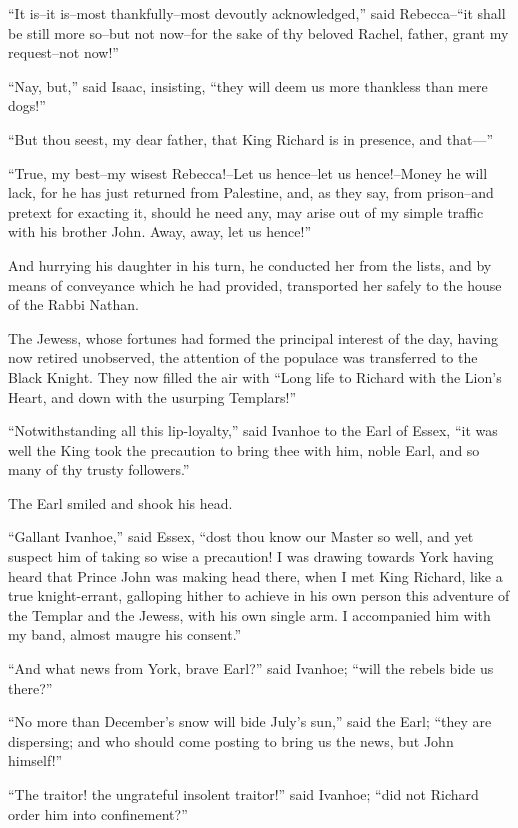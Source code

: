 ``It is--it is--most thankfully--most devoutly acknowledged,'' said
Rebecca--``it shall be still more so--but not now--for the sake of thy
beloved Rachel, father, grant my request--not now!''

``Nay, but,'' said Isaac, insisting, ``they will deem us more thankless
than mere dogs!''

``But thou seest, my dear father, that King Richard is in presence, and
that---''

``True, my best--my wisest Rebecca!--Let us hence--let us hence!--Money
he will lack, for he has just returned from Palestine, and, as they say,
from prison--and pretext for exacting it, should he need any, may arise
out of my simple traffic with his brother John. Away, away, let us
hence!''

And hurrying his daughter in his turn, he conducted her from the lists,
and by means of conveyance which he had provided, transported her safely
to the house of the Rabbi Nathan.

The Jewess, whose fortunes had formed the principal interest of the day,
having now retired unobserved, the attention of the populace was
transferred to the Black Knight. They now filled the air with ``Long
life to Richard with the Lion's Heart, and down with the usurping
Templars!''

``Notwithstanding all this lip-loyalty,'' said Ivanhoe to the Earl of
Essex, ``it was well the King took the precaution to bring thee with
him, noble Earl, and so many of thy trusty followers.''

The Earl smiled and shook his head.

``Gallant Ivanhoe,'' said Essex, ``dost thou know our Master so well,
and yet suspect him of taking so wise a precaution! I was drawing
towards York having heard that Prince John was making head there, when I
met King Richard, like a true knight-errant, galloping hither to achieve
in his own person this adventure of the Templar and the Jewess, with his
own single arm. I accompanied him with my band, almost maugre his
consent.''

``And what news from York, brave Earl?'' said Ivanhoe; ``will the rebels
bide us there?''

``No more than December's snow will bide July's sun,'' said the Earl;
``they are dispersing; and who should come posting to bring us the news,
but John himself!''

``The traitor! the ungrateful insolent traitor!'' said Ivanhoe; ``did
not Richard order him into confinement?''


